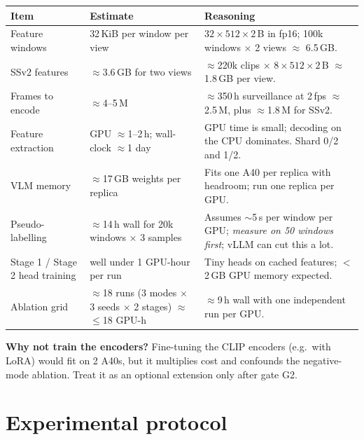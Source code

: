 \documentclass[11pt,a4paper]{article}
\begin{document}
\begin{tabularx}{\linewidth}{@{}l Y Y@{}}
\toprule
Item & Estimate & Reasoning\\
\midrule
Feature windows & 32\,KiB per window per view & $32\times512\times2$\,B in fp16; 100k windows $\times$ 2 views $\approx$ 6.5\,GB.\\
SSv2 features & $\approx$3.6\,GB for two views & $\approx$220k clips $\times$ $8\times512\times2$\,B $\approx$ 1.8\,GB per view.\\
Frames to encode & $\approx$4--5\,M & $\approx$350\,h surveillance at 2\,fps $\approx$2.5\,M, plus $\approx$1.8\,M for SSv2.\\
Feature extraction & GPU $\approx$1--2\,h; wall-clock $\approx$1 day & GPU time is small; decoding on the CPU dominates. Shard 0/2 and 1/2.\\
VLM memory & $\approx$17\,GB weights per replica & Fits one A40 per replica with headroom; run one replica per GPU.\\
Pseudo-labelling & $\approx$14\,h wall for 20k windows $\times$ 3 samples & Assumes $\sim$5\,s per window per GPU; \emph{measure on 50 windows first}; vLLM can cut this a lot.\\
Stage 1 / Stage 2 head training & well under 1 GPU-hour per run & Tiny heads on cached features; $<$2\,GB GPU memory expected.\\
Ablation grid & $\approx$18 runs ($3$ modes $\times$ 3 seeds $\times$ 2 stages) $\approx$ $\le$18 GPU-h & $\approx$9\,h wall with one independent run per GPU.\\
\bottomrule
\end{tabularx}
\label{tab:compute}

\medskip\noindent\textbf{Why not train the encoders?} Fine-tuning the CLIP encoders (e.g.\ with LoRA) would fit on 2 A40s, but it multiplies cost and confounds the negative-mode ablation. Treat it as an optional extension only after gate G2.

\section{Experimental protocol}
\label{sec:eval}
\end{document}
